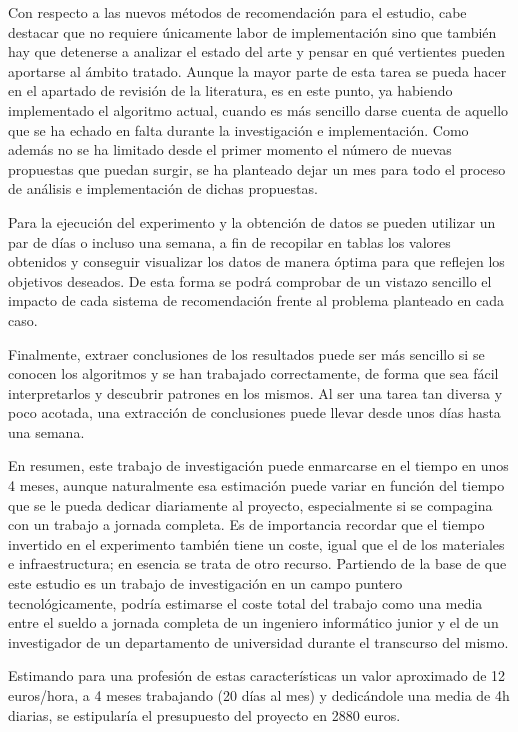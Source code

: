 Con respecto a las nuevos métodos de recomendación para el estudio, cabe destacar que no requiere únicamente labor de implementación sino que también hay que detenerse a analizar el estado del arte y pensar en qué vertientes pueden aportarse al ámbito tratado. Aunque la mayor parte de esta tarea se pueda hacer en el apartado de revisión de la literatura, es en este punto, ya habiendo implementado el algoritmo actual, cuando es más sencillo darse cuenta de aquello que se ha echado en falta durante la investigación e implementación. Como además no se ha limitado desde el primer momento el número de nuevas propuestas que puedan surgir, se ha planteado dejar un mes para todo el proceso de análisis e implementación de dichas propuestas.

Para la ejecución del experimento y la obtención de datos se pueden utilizar un par de días o incluso una semana, a fin de recopilar en tablas los valores obtenidos y conseguir visualizar los datos de manera óptima para que reflejen los objetivos deseados. De esta forma se podrá comprobar de un vistazo sencillo el impacto de cada sistema de recomendación frente al problema planteado en cada caso.

Finalmente, extraer conclusiones de los resultados puede ser más sencillo si se conocen los algoritmos y se han trabajado correctamente, de forma que sea fácil interpretarlos y descubrir patrones en los mismos. Al ser una tarea tan diversa y poco acotada, una extracción de conclusiones puede llevar desde unos días hasta una semana.

En resumen, este trabajo de investigación puede enmarcarse en el tiempo en unos 4 meses, aunque naturalmente esa estimación puede variar en función del tiempo que se le pueda dedicar diariamente al proyecto, especialmente si se compagina con un trabajo a jornada completa. Es de importancia recordar que el tiempo invertido en el experimento también tiene un coste, igual que el de los materiales e infraestructura; en esencia se trata de otro recurso. Partiendo de la base de que este estudio es un trabajo de investigación en un campo puntero tecnológicamente, podría estimarse el coste total del trabajo como una media entre el sueldo a jornada completa de un ingeniero informático junior y el de un investigador de un departamento de universidad durante el transcurso del mismo.

Estimando para una profesión de estas características un valor aproximado de 12 euros/hora, a 4 meses trabajando (20 días al mes) y dedicándole una media de 4h diarias, se estipularía el presupuesto del proyecto en 2880 euros.

